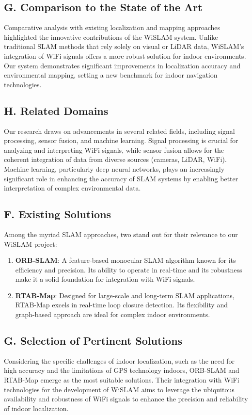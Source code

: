 \documentclass[
	a4paper, %
	11pt, %
	unnumberedsections, %
	twoside, %
]{LTJournalArticle}
\begin{document}
\subsection{G.	Comparison to the State of the Art}
Comparative analysis with existing localization and mapping approaches highlighted the innovative contributions of the WiSLAM system. Unlike traditional SLAM methods that rely solely on visual or LiDAR data, WiSLAM's integration of WiFi signals offers a more robust solution for indoor environments. Our system demonstrates significant improvements in localization accuracy and environmental mapping, setting a new benchmark for indoor navigation technologies.

\subsection{H.	Related Domains}
Our research draws on advancements in several related fields, including signal processing, sensor fusion, and machine learning. Signal processing is crucial for analyzing and interpreting WiFi signals, while sensor fusion allows for the coherent integration of data from diverse sources (cameras, LiDAR, WiFi). Machine learning, particularly deep neural networks, plays an increasingly significant role in enhancing the accuracy of SLAM systems by enabling better interpretation of complex environmental data.

\subsection{F.	Existing Solutions}
Among the myriad SLAM approaches, two stand out for their relevance to our WiSLAM project:

\begin{enumerate}
	\item \textbf{ORB-SLAM}: A feature-based monocular SLAM algorithm known for its efficiency and precision. Its ability to operate in real-time and its robustness make it a solid foundation for integration with WiFi signals.
	\item \textbf{RTAB-Map}: Designed for large-scale and long-term SLAM applications, RTAB-Map excels in real-time loop closure detection. Its flexibility and graph-based approach are ideal for complex indoor environments.
\end{enumerate}

\subsection{G.	Selection of Pertinent Solutions}
Considering the specific challenges of indoor localization, such as the need for high accuracy and the limitations of GPS technology indoors, ORB-SLAM and RTAB-Map emerge as the most suitable solutions. Their integration with WiFi technologies for the development of WiSLAM aims to leverage the ubiquitous availability and robustness of WiFi signals to enhance the precision and reliability of indoor localization.
\end{document}
